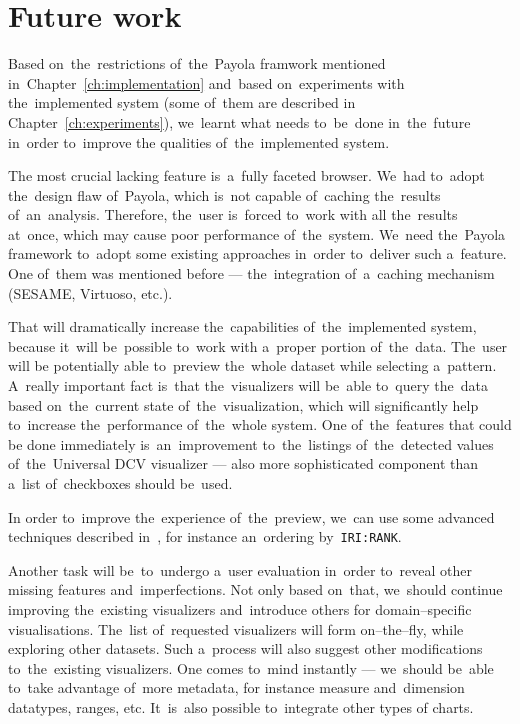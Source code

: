 \chapter{Future work}
\label{ch:future}

\begin{sloppypar}
Based on~the~restrictions of~the~Payola framwork mentioned in~Chapter~\ref{ch:implementation}
and~based on~experiments with the~implemented system (some of~them are described in
Chapter~\ref{ch:experiments}), we~learnt what needs to~be~done in~the~future in~order to~improve
the qualities of~the~implemented system.
\end{sloppypar}

The most crucial lacking feature is~a~fully faceted browser. We~had to~adopt the~design flaw of~Payola, which is~not capable of~caching the~results of~an~analysis. 
Therefore, the~user is~forced to~work with all the~results at~once, which may 
cause poor performance of~the~system. We~need the~Payola framework to~adopt some 
existing approaches in~order to~deliver such a~feature. One of~them was 
mentioned before --- the~integration of~a~caching mechanism (SESAME, Virtuoso, etc.).

That will dramatically increase the~capabilities of~the~implemented system, 
because it~will be~possible to~work with a~proper portion of~the~data. The~user will 
be potentially able to~preview the~whole dataset while selecting a~pattern. A~really important fact is~that the~visualizers will be~able to~query the~data 
based on~the~current state of~the~visualization, which will significantly help 
to~increase the~performance of~the~whole system. One of~the~features that could 
be done immediately is~an~improvement to~the~listings of~the~detected values of~the~Universal DCV visualizer --- also more sophisticated component than a~list of~checkboxes should be~used.

In order to~improve the~experience of~the~preview, we~can use some advanced 
techniques described in~\cite{faceted-ldow2009}, for instance an~ordering by~\texttt{IRI:RANK}.

Another task will be~to~undergo a~user evaluation in~order to~reveal other 
missing features and~imperfections. Not only based on~that, we~should continue 
improving the~existing visualizers and~introduce others for
domain--specific visualisations. The~list of~requested visualizers will form 
on--the--fly, while exploring other datasets. Such a~process will also suggest 
other modifications to~the~existing visualizers. One comes to~mind instantly --- we~should be~able to~take advantage of~more metadata, for instance measure and~dimension datatypes, ranges, etc. It~is~also possible to~integrate other types 
of charts.

